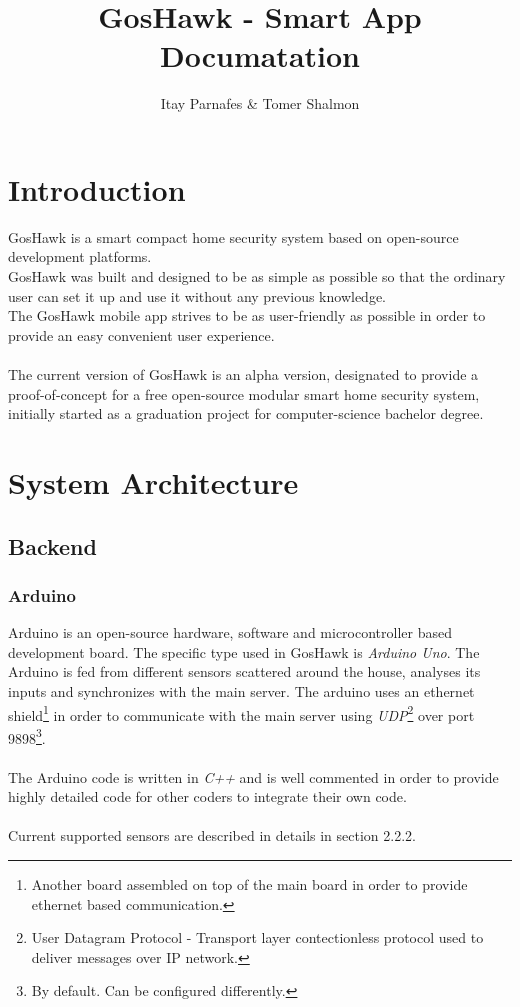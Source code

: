 \documentclass[10pt]{article}
\title{GosHawk - Smart App \\ Documatation}
\author{Itay Parnafes \& Tomer Shalmon}
\begin{document}
\maketitle
\date
\newpage
\tableofcontents
\newpage
\section{Introduction}
GosHawk is a smart compact home security system based on open-source development platforms. \\
GosHawk was built and designed to be as simple as possible so that the ordinary user can set it up and use it without any previous knowledge. \\
The GosHawk mobile app strives to be as user-friendly as possible in order to provide an easy convenient user experience. 
\\ \\
The current version of GosHawk is an alpha version, designated to provide a proof-of-concept for a free open-source modular smart home security system, initially started as a graduation project for computer-science bachelor degree.

\newpage
\section{System Architecture}
\subsection{Backend}
\subsubsection{Arduino}
Arduino is an open-source hardware, software and microcontroller based development board.
The specific type used in GosHawk is \emph{Arduino Uno}.
The Arduino is fed from different sensors scattered around the house, analyses its inputs and synchronizes with the main server.
The arduino uses an ethernet shield\footnote{Another board assembled on top of the main board in order to provide ethernet based communication.} in order to communicate with the main server using \emph{UDP}\footnote{User Datagram Protocol - Transport layer contectionless protocol used to deliver messages over IP network.} over port 9898\footnote{By default. Can be configured differently.}.
\\ \\
\quad The Arduino code is written in \emph{C++} and is well commented in order to provide highly detailed code for other coders to integrate their own code.
\\ \\Current supported sensors are described in details in section 2.2.2.
\end{document}
